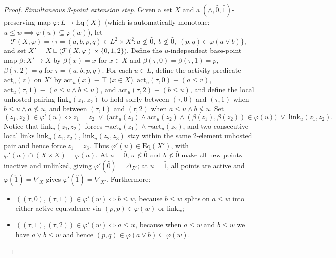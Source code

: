 \documentclass[11pt]{article}
\theoremstyle{definition}
\theoremstyle{remark}
\newcommand{\Eq}{\mathrm{Eq}}
\begin{document}
\begin{proof}
\emph{Simultaneous 3-point extension step.} Given a set $X$ and a $(\wedge,\hat{0},\hat{1})$-preserving map $\varphi \colon L \to \Eq(X)$ (which is automatically monotone: $u \le w \implies \varphi(u) \subseteq \varphi(w)$), let
\[
  \mathcal{T}(X,\varphi) = \bigl\{\tau = (a,b,p,q) \in L^2 \times X^2 : a \not\le \hat{0},\; b \not\le \hat{0},\; (p,q) \in \varphi(a \vee b)\bigr\},
\]
and set $X' = X \sqcup \bigl(\mathcal{T}(X,\varphi) \times \{0,1,2\}\bigr)$. Define the $u$-independent base-point map $\beta \colon X' \to X$ by $\beta(x)=x$ for $x \in X$ and $\beta(\tau,0)=\beta(\tau,1)=p$, $\beta(\tau,2)=q$ for $\tau=(a,b,p,q)$. For each $u \in L$, define the activity predicate $\mathrm{act}_u(z)$ on $X'$ by $\mathrm{act}_u(x) \equiv \top$ ($x \in X$), $\mathrm{act}_u(\tau,0) \equiv (a \le u)$, $\mathrm{act}_u(\tau,1) \equiv (a \le u \land b \le u)$, and $\mathrm{act}_u(\tau,2) \equiv (b \le u)$, and define the local unhosted pairing $\mathrm{link}_u(z_1,z_2)$ to hold solely between $(\tau,0)$ and $(\tau,1)$ when $b \le u \land a \not\le u$, and between $(\tau,1)$ and $(\tau,2)$ when $a \le u \land b \not\le u$. Set
\[
  (z_1, z_2) \in \varphi'(u) \iff z_1 = z_2 \;\lor\;
  \bigl(\mathrm{act}_u(z_1) \land \mathrm{act}_u(z_2) \land (\beta(z_1),\beta(z_2)) \in \varphi(u)\bigr)
  \;\lor\; \mathrm{link}_u(z_1,z_2).
\]
Notice that $\mathrm{link}_u(z_1,z_2)$ forces $\neg\mathrm{act}_u(z_1) \land \neg\mathrm{act}_u(z_2)$, and two consecutive local links $\mathrm{link}_u(z_1,z_2)$, $\mathrm{link}_u(z_2,z_3)$ stay within the same 2-element unhosted pair and hence force $z_1 = z_3$. Thus $\varphi'(u) \in \Eq(X')$, with $\varphi'(u) \cap (X \times X) = \varphi(u)$. At $u = \hat{0}$, $a \not\le \hat{0}$ and $b \not\le \hat{0}$ make all new points inactive and unlinked, giving $\varphi'(\hat{0}) = \Delta_{X'}$; at $u = \hat{1}$, all points are active and $\varphi(\hat{1})=\nabla_X$ gives $\varphi'(\hat{1}) = \nabla_{X'}$. Furthermore:
\begin{itemize}
\item $((\tau,0),(\tau,1)) \in \varphi'(w) \iff b \le w$, because $b \le w$ splits on $a \le w$ into either active equivalence via $(p,p) \in \varphi(w)$ or $\mathrm{link}_w$;
\item $((\tau,1),(\tau,2)) \in \varphi'(w) \iff a \le w$, because when $a \le w$ and $b \le w$ we have $a \vee b \le w$ and hence $(p,q) \in \varphi(a \vee b) \subseteq \varphi(w)$.
\end{itemize}

\end{proof}
\end{document}
